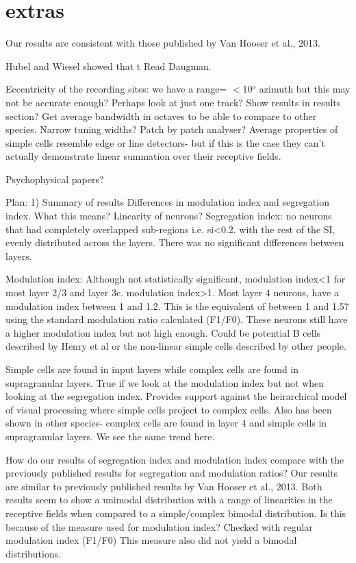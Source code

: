 \chapter{extras}


Our results are consistent with those published by Van Hooser et al., 2013.



Hubel and Wiesel showed that t
Read Daugman.

Eccentricity of the recording sites: we have a range= $<$10$^o$ azimuth but this may not be accurate enough? Perhaps look at just one track? Show results in results section? 
Get average bandwidth in octaves to be able to compare to other species.
Narrow tuning widths?
Patch by patch analyser?
Average properties of simple cells resemble edge or line detectors- but if this is the case they can't actually demonstrate linear summation over their receptive fields.

Psychophysical papers?


Plan:
1) Summary of results
Differences in modulation index and segregation index. What this means? Linearity of neurons?
Segregation index: no neurons that had completely overlapped sub-regions i.e. si<0.2.
with the rest of the SI, evenly distributed across the layers.
There was no significant differences between layers.

Modulation index: Although not statistically significant, modulation index<1 for most layer 2/3 and layer 3c. modulation index>1. Most layer 4 neurons, have a modulation index between 1 and 1.2. This is the equivalent of between 1 and 1.57 using the standard modulation ratio calculated (F1/F0). These neurons still have a higher modulation index but not high enough. Could be potential B cells described by Henry et al or the non-linear simple cells described by other people. 

Simple cells are found in input layers while complex cells are found in supragranular layers. True if we look at the modulation index but not when looking at the segregation index. Provides support against the heirarchical model of visual processing where simple cells project to complex cells. Also has been shown in other species- complex cells are found in layer 4 and simple cells in supragranular layers. We see the same trend here.

How do our results of segregation index and modulation index compare with the previously published results for segregation and modulation ratios?  Our results are similar to previously published results by Van Hooser et al., 2013. Both results seem to show a unimodal distribution with a range of linearities in the receptive fields when compared to a simple/complex bimodal distribution. Is this because of the measure used for modulation index? Checked with regular modulation index (F1/F0) This measure also did not yield a bimodal distributions.

